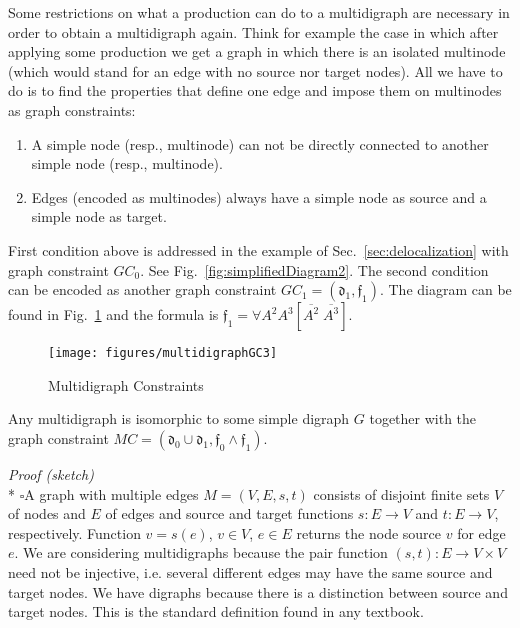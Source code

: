 \documentclass{fundam}
\begin{document}
Some restrictions on what a production can do to a multidigraph are
necessary in order to obtain a multidigraph again. Think for example
the case in which after applying some production we get a graph in
which there is an isolated multinode (which would stand for an edge
with no source nor target nodes). All we have to do is to find the
properties that define one edge and impose them on multinodes as graph
constraints:
\begin{enumerate}
\item A simple node (resp., multinode) can not be directly connected
  to another simple node (resp., multinode).
\item Edges (encoded as multinodes) always have a simple node as
  source and a simple node as target.
\end{enumerate}

First condition above is addressed in the example of
Sec.~\ref{sec:delocalization} with graph constraint $GC_0$. See
Fig.~\ref{fig:simplifiedDiagram2}. The second condition can be encoded
as another graph constraint $GC_1 = \left( \mathfrak{d}_1,
  \mathfrak{f}_1 \right)$. The diagram can be found in
Fig.~\ref{fig:multidigraphGC2} and the formula is $\mathfrak{f}_1 =
\forall A^2 A^3 [ \overline{A^2} \; \overline{A^3} ]$.

\begin{figure}[htbp]
  \centering
  \texttt{[image: figures/multidigraphGC3]}
  \caption{Multidigraph Constraints}
  \label{fig:multidigraphGC2}
\end{figure}



\begin{theorem}
  \label{th:multidigraph}
  Any multidigraph is isomorphic to some simple digraph $G$ together
  with the graph constraint $MC = \left( \mathfrak{d}_0 \cup
    \mathfrak{d}_1, \mathfrak{f}_0 \wedge \mathfrak{f}_1 \right)$.
\end{theorem}

\noindent \emph{Proof (sketch)}\\*
$\square$A graph with multiple edges $M = \left( V,E,s,t \right)$
consists of disjoint finite sets $V$ of nodes and $E$ of edges and
source and target functions $s:E \rightarrow V$ and $t:E \rightarrow
V$, respectively.  Function $v = s(e)$, $v \in V$, $e \in E$ returns
the node source $v$ for edge $e$.  We are considering multidigraphs
because the pair function $(s,t):E\rightarrow V\times V$ need not be
injective, i.e. several different edges may have the same source and
target nodes.  We have digraphs because there is a distinction between
source and target nodes.  This is the standard definition found in any
textbook.
\end{document}
